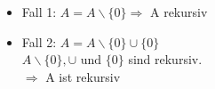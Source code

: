 \documentclass[a4paper]{scrartcl}%
\begin{document}
    \begin{itemize}
        \item Fall 1: $A = A \backslash \{0\} \Rightarrow$ A rekursiv \lightning\\
        \item Fall 2: $A = A \backslash \{0\} \cup  \{0\}$\\
            $A \backslash \{0\}, \cup \text{ und } \{0\}$ sind rekursiv.\\
            $\Rightarrow$ A ist rekursiv \lightning\\
    \end{itemize}%
\end{document}
